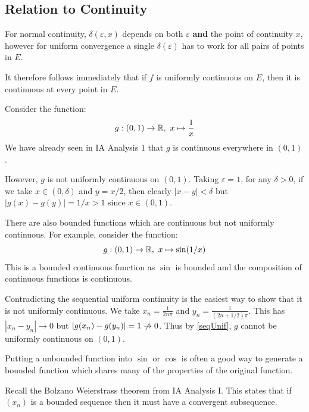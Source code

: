 \documentclass[../main.tex]{subfiles}
\begin{document}
\subsection{Relation to Continuity}
\begin{remark}[Intuition]
  For normal continuity, $\delta(\varepsilon, x)$ depends on both $\varepsilon$ \textbf{and} the point of continuity $x$, however for uniform convergence a single $\delta(\varepsilon)$ has to work for all pairs of points in $E$.

  It therefore follows immediately that if $f$ is uniformly continuous on $E$, then it is continuous at every point in $E$.
\end{remark}
\begin{example}
  Consider the function:
  \[
    g: (0, 1) \to \mathbb{R},\ x \mapsto \frac{1}{x}
  \]
  We have already seen in IA Analysis 1 that $g$ is continuous everywhere in $(0, 1)$.

  However, $g$ is not uniformly continuous on $(0, 1)$.
  Taking $\varepsilon = 1$, for any $\delta > 0$, if we take $x \in (0, \delta)$ and $y = x/2$, then clearly $|x - y| < \delta$ but $|g(x) - g(y)| = 1/x > 1$ since $x \in (0, 1)$.
\end{example}
\begin{example}
  There are also bounded functions which are continuous but not uniformly continuous.
  For example, consider the function:
  \[
    g: (0, 1) \to \mathbb{R},\ x \mapsto \sin(1/x)
  \]
  This is a bounded continuous function as $\sin$ is bounded and the composition of continuous functions is continuous.

  Contradicting the sequential uniform continuity is the easiest way to show that it is not uniformly continuous.
  We take $x_n = \frac{1}{2n\pi}$ and $y_n = \frac{1}{(2n + 1/2)\pi}$.
  This has $|x_n - y_n| \to 0$ but $|g(x_n) - g(y_n)| = 1 \centernot\to 0$.
  Thus by \cref{seqUnif}, $g$ cannot be uniformly continuous on $(0, 1)$.
\end{example}
\begin{remark}[Advice]
  Putting a unbounded function into $\sin$ or $\cos$ is often a good way to generate a bounded function which shares many of the properties of the original function.
\end{remark}
\begin{remark}[Recap]
  Recall the Bolzano Weierstrass theorem from IA Analysis I.
  This states that if $(x_n)$ is a bounded sequence then it must have a convergent subsequence.
\end{remark}
\end{document}
